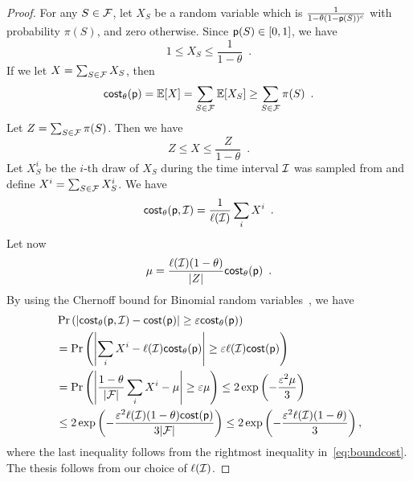 \begin{proof}
	For any $S\in\mathcal{F}$, let $X_S$ be a random variable which is
	$\frac{1}{1-\theta(1-\mathsf{p}(S))^c}$ with probability $\pi(S)$, and zero
	otherwise. Since $\mathsf{p}(S)\in [0,1]$, we have
	\[
		1\leq X_S \leq \frac{1}{1-\theta}\enspace.
	\]
	If we let $X = \sum_{S\in \mathcal{F}} X_S$, then
	\begin{equation}\label{eq:boundcost}
		\mathsf{cost}_\theta(\mathsf{p}) = \mathbb{E}[X] = \sum_{S\in\mathcal{F}} \mathbb{E}[X_{S}]
		\geq \sum_{S\in\mathcal{F}}\pi(S)\enspace.
	\end{equation}
	Let $Z=\sum_{S\in\mathcal{F}}\pi(S)$. Then we have
	\[
		Z \leq X \leq \frac{Z}{1-\theta}\enspace.
	\]
	Let $X^i_S$ be the $i$-th draw of $X_S$ during the time interval $\mathcal{I}$
	was sampled from and define $X^i = \sum_{S\in\mathcal{F}}X_S^i$. We have
	\[
		\mathsf{cost}_\theta(\mathsf{p},\mathcal{I}) =
		\frac{1}{\ell(\mathcal{I})}\sum_{i}X^i\enspace.
	\]
	Let now
	\[
		\mu=\frac{\ell(\mathcal{I})(1-\theta)}{|Z|}\mathsf{cost}_\theta(\mathsf{p})\enspace.
	\]
	By using the Chernoff bound for Binomial random
	variables~\citep[Corol.~4.6]{MitzenmacherU05}, we have
	\begin{align*}
		&\Pr\left(\left|\mathsf{cost}_\theta(\mathsf{p},\mathcal{I}) - \mathsf{cost}(\mathsf{p})\right| \geq \varepsilon
		\mathsf{cost}_\theta(\mathsf{p})\right)\\
		&=\Pr\left(\left|\sum_i X^i - \ell(\mathcal{I})\mathsf{cost}_\theta(\mathsf{p})\right| \geq \varepsilon
		\ell(\mathcal{I}) \mathsf{cost}(\mathsf{p})\right) \\
		&= \Pr\left(\left|\frac{1-\theta}{|\mathcal{F}|}\sum_i X^i - \mu\right| \geq \varepsilon
		\mu\right) \leq 2\exp\left(-\frac{\varepsilon^2\mu}{3}\right)\\
		&\le 2\exp\left(-\frac{\varepsilon^2 \ell(\mathcal{I}) (1-\theta)
			\mathsf{cost}(\mathsf{p})}{3|\mathcal{F}|}\right) \leq 2\exp\left(-\frac{\varepsilon^2 \ell(\mathcal{I}) (1-\theta)}{3}\right),
	\end{align*}
	where the last inequality follows from the rightmost inequality
	in~\eqref{eq:boundcost}. The thesis follows from our choice of
	$\ell(\mathcal{I})$.
\end{proof}

